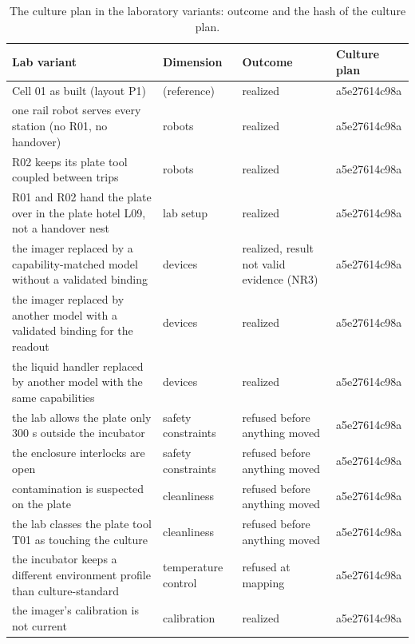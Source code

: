 \documentclass[10pt,a4paper]{article}
\begin{document}
\begin{table}[tbp]\centering\small
\caption{The culture plan in the laboratory variants: outcome and the hash of the culture plan.}\label{tab:labs}
\begin{tabularx}{\linewidth}{Xlll}\toprule
\textbf{Lab variant} & \textbf{Dimension} & \textbf{Outcome} & \textbf{Culture plan} \\\midrule
Cell 01 as built (layout P1) & (reference) & realized & a5e27614c98a \\
one rail robot serves every station (no R01, no handover) & robots & realized & a5e27614c98a \\
R02 keeps its plate tool coupled between trips & robots & realized & a5e27614c98a \\
R01 and R02 hand the plate over in the plate hotel L09, not a handover nest & lab setup & realized & a5e27614c98a \\
the imager replaced by a capability-matched model without a validated binding & devices & realized, result not valid evidence (NR3) & a5e27614c98a \\
the imager replaced by another model with a validated binding for the readout & devices & realized & a5e27614c98a \\
the liquid handler replaced by another model with the same capabilities & devices & realized & a5e27614c98a \\
the lab allows the plate only 300 s outside the incubator & safety constraints & refused before anything moved & a5e27614c98a \\
the enclosure interlocks are open & safety constraints & refused before anything moved & a5e27614c98a \\
contamination is suspected on the plate & cleanliness & refused before anything moved & a5e27614c98a \\
the lab classes the plate tool T01 as touching the culture & cleanliness & refused before anything moved & a5e27614c98a \\
the incubator keeps a different environment profile than culture-standard & temperature control & refused at mapping & a5e27614c98a \\
the imager's calibration is not current & calibration & realized & a5e27614c98a \\\bottomrule
\end{tabularx}
\end{table}
\end{document}

